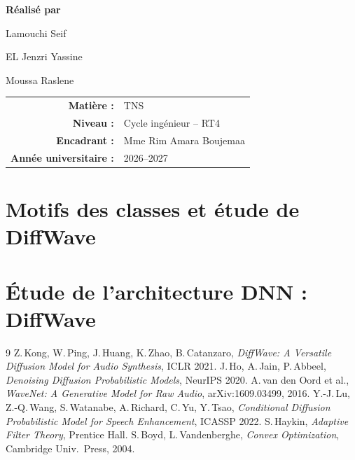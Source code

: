 \documentclass[12pt,a4paper]{report}
\begin{document}
\begin{titlepage}
{\Large\textbf{Réalisé par}\par}
\vspace{.25cm}

{\Large Lamouchi Seif\par}
\vspace{.08cm}
{\Large EL Jenzri Yassine\par}
\vspace{.08cm}
{\Large Moussa Raslene\par}

\vfill

\begin{tabular}{rl}
\textbf{Matière :} & TNS\\
\textbf{Niveau :} & Cycle ingénieur -- RT4 \\
\textbf{Encadrant :} & Mme Rim Amara Boujemaa\\
\textbf{Année universitaire :} & 2026--2027
\end{tabular}

\vspace{.45cm}

\end{titlepage}

\clearpage
{}


\tableofcontents
\listoffigures
\listoftables

\chapter{Motifs des classes et étude de DiffWave}






\chapter{Étude de l’architecture DNN : DiffWave}











\begin{thebibliography}{9}\small
{} Z.\,Kong, W.\,Ping, J.\,Huang, K.\,Zhao, B.\,Catanzaro, \emph{DiffWave: A Versatile Diffusion Model for Audio Synthesis}, ICLR 2021.
 J.\,Ho, A.\,Jain, P.\,Abbeel, \emph{Denoising Diffusion Probabilistic Models}, NeurIPS 2020.
 A.\,van den Oord et al., \emph{WaveNet: A Generative Model for Raw Audio}, arXiv:1609.03499, 2016.
 Y.-J.\,Lu, Z.-Q.\,Wang, S.\,Watanabe, A.\,Richard, C.\,Yu, Y.\,Tsao, \emph{Conditional Diffusion Probabilistic Model for Speech Enhancement}, ICASSP 2022.
 S.\,Haykin, \emph{Adaptive Filter Theory}, Prentice Hall.
 S.\,Boyd, L.\,Vandenberghe, \emph{Convex Optimization}, Cambridge Univ.\ Press, 2004.
\end{thebibliography}
\end{document}

